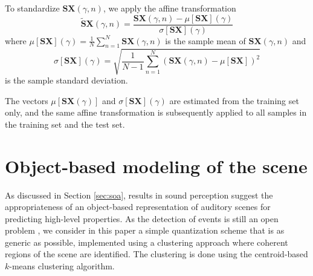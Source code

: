 \documentclass[journal]{IEEEtran}
\begin{document}
To standardize $\mathbf{S}\boldsymbol{X}(\gamma,n)$, we apply the affine transformation
\begin{equation}
\widetilde{\mathbf{S}}\boldsymbol{X}(\gamma, n) =
\dfrac{ \mathbf{S}\boldsymbol{X}(\gamma, n) -
\mu[ \mathbf{S}\boldsymbol{X}](\gamma)}{\sigma[ \mathbf{S}\boldsymbol{X}](\gamma)}
\end{equation}
where $\mu[ \mathbf{S}\boldsymbol{X}](\gamma) = \frac{1}{N} \sum_{n=1}^{N} \mathbf{S}\boldsymbol{X}(\gamma,n)$ is the sample mean of $\mathbf{S}\boldsymbol{X}(\gamma,n)$ and
\begin{equation}
\sigma[\mathbf{S}\boldsymbol{X}] (\gamma) =
\sqrt{\frac{1}{N-1} \sum_{n=1}^{N}
\left( \mathbf{S}\boldsymbol{X}(\gamma,n) - \mu[\mathbf{S}\boldsymbol{X}] \right)^2}
\end{equation}
is the sample standard deviation.

The vectors $\mu[\mathbf{S}\boldsymbol{X}(\gamma)]$ and $\sigma[\mathbf{S}\boldsymbol{X}](\gamma)$ are estimated from the training set only, and the same affine transformation is subsequently applied to all samples in the training set and the test set.

\section{Object-based modeling of the scene}
\label{sec:object}



As discussed in Section \ref{sec:soa}, results in sound perception suggest the appropriateness of an object-based representation of auditory scenes for predicting high-level properties. As the detection of events is still an open problem \cite{7100934},  we consider in this paper a simple quantization scheme that is as generic as possible, implemented using a clustering approach where coherent regions of the scene are identified. The clustering is done using the centroid-based $k$-means clustering algorithm.
\end{document}
